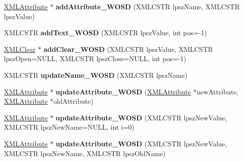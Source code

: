 \begin{DoxyCompactItemize}
\item 
\hyperlink{struct_x_m_l_attribute}{X\+M\+L\+Attribute} $\ast$ {\bfseries add\+Attribute\+\_\+\+W\+O\+SD} (X\+M\+L\+C\+S\+TR lpsz\+Name, X\+M\+L\+C\+S\+TR lpsz\+Value)\hypertarget{struct_x_m_l_node_a776e46bdd596a7eff1d2dd4105c64034}{}\label{struct_x_m_l_node_a776e46bdd596a7eff1d2dd4105c64034}

\item 
X\+M\+L\+C\+S\+TR {\bfseries add\+Text\+\_\+\+W\+O\+SD} (X\+M\+L\+C\+S\+TR lpsz\+Value, int pos=-\/1)\hypertarget{struct_x_m_l_node_ab05f39710a61064adf3af30fd430acf2}{}\label{struct_x_m_l_node_ab05f39710a61064adf3af30fd430acf2}

\item 
\hyperlink{struct_x_m_l_clear}{X\+M\+L\+Clear} $\ast$ {\bfseries add\+Clear\+\_\+\+W\+O\+SD} (X\+M\+L\+C\+S\+TR lpsz\+Value, X\+M\+L\+C\+S\+TR lpsz\+Open=N\+U\+LL, X\+M\+L\+C\+S\+TR lpsz\+Close=N\+U\+LL, int pos=-\/1)\hypertarget{struct_x_m_l_node_a6ea1fad6ada2038f5cf2605839694d31}{}\label{struct_x_m_l_node_a6ea1fad6ada2038f5cf2605839694d31}

\item 
X\+M\+L\+C\+S\+TR {\bfseries update\+Name\+\_\+\+W\+O\+SD} (X\+M\+L\+C\+S\+TR lpsz\+Name)\hypertarget{struct_x_m_l_node_af7cff0d6f43d4e6f163f2738a71ec4e5}{}\label{struct_x_m_l_node_af7cff0d6f43d4e6f163f2738a71ec4e5}

\item 
\hyperlink{struct_x_m_l_attribute}{X\+M\+L\+Attribute} $\ast$ {\bfseries update\+Attribute\+\_\+\+W\+O\+SD} (\hyperlink{struct_x_m_l_attribute}{X\+M\+L\+Attribute} $\ast$new\+Attribute, \hyperlink{struct_x_m_l_attribute}{X\+M\+L\+Attribute} $\ast$old\+Attribute)\hypertarget{struct_x_m_l_node_a62a2c0cad7809a03afc485351c9560da}{}\label{struct_x_m_l_node_a62a2c0cad7809a03afc485351c9560da}

\item 
\hyperlink{struct_x_m_l_attribute}{X\+M\+L\+Attribute} $\ast$ {\bfseries update\+Attribute\+\_\+\+W\+O\+SD} (X\+M\+L\+C\+S\+TR lpsz\+New\+Value, X\+M\+L\+C\+S\+TR lpsz\+New\+Name=N\+U\+LL, int i=0)\hypertarget{struct_x_m_l_node_aab4e4f09a253842ec329f3af90b74cf9}{}\label{struct_x_m_l_node_aab4e4f09a253842ec329f3af90b74cf9}

\item 
\hyperlink{struct_x_m_l_attribute}{X\+M\+L\+Attribute} $\ast$ {\bfseries update\+Attribute\+\_\+\+W\+O\+SD} (X\+M\+L\+C\+S\+TR lpsz\+New\+Value, X\+M\+L\+C\+S\+TR lpsz\+New\+Name, X\+M\+L\+C\+S\+TR lpsz\+Old\+Name)\hypertarget{struct_x_m_l_node_a25e0857638217206b11ee8fe99f7ed86}{}\label{struct_x_m_l_node_a25e0857638217206b11ee8fe99f7ed86}


\end{DoxyCompactItemize}
